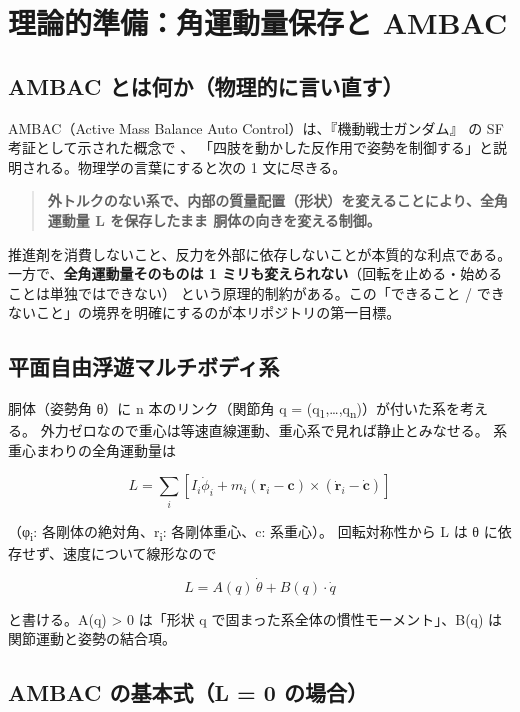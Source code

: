 \chapter{理論的準備：角運動量保存と AMBAC}\label{ch:theory}

\section{AMBAC とは何か（物理的に言い直す）}

AMBAC（Active Mass Balance Auto Control）は、『機動戦士ガンダム』\cite{R1} の SF 考証として示された概念で \cite{R42}、 「四肢を動かした反作用で姿勢を制御する」と説明される。物理学の言葉にすると次の 1 文に尽きる。

\begin{quote}
\textbf{外トルクのない系で、内部の質量配置（形状）を変えることにより、全角運動量 L を保存したまま 胴体の向きを変える制御。}
\end{quote}

推進剤を消費しないこと、反力を外部に依存しないことが本質的な利点である。 一方で、\textbf{全角運動量そのものは 1 ミリも変えられない}（回転を止める・始めることは単独ではできない） という原理的制約がある。この「できること / できないこと」の境界を明確にするのが本リポジトリの第一目標。

\section{平面自由浮遊マルチボディ系}

胴体（姿勢角 θ）に n 本のリンク（関節角 q = (q\textsubscript{1},\ldots,q\textsubscript{n})）が付いた系を考える。 外力ゼロなので重心は等速直線運動、重心系で見れば静止とみなせる。 系重心まわりの全角運動量は

\[
L = \sum_i \left[ I_i \dot\phi_i + m_i (\mathbf r_i - \mathbf c) \times (\dot{\mathbf r}_i - \dot{\mathbf c}) \right]
\]

（φ\textsubscript{i}: 各剛体の絶対角、r\textsubscript{i}: 各剛体重心、c: 系重心）。 回転対称性から L は θ に依存せず、速度について線形なので

\[
L = A(q)\,\dot\theta + B(q)\cdot\dot q
\]

と書ける。A(q) \textgreater{} 0 は「形状 q で固まった系全体の慣性モーメント」、B(q) は関節運動と姿勢の結合項。

\section{AMBAC の基本式（L = 0 の場合）}

